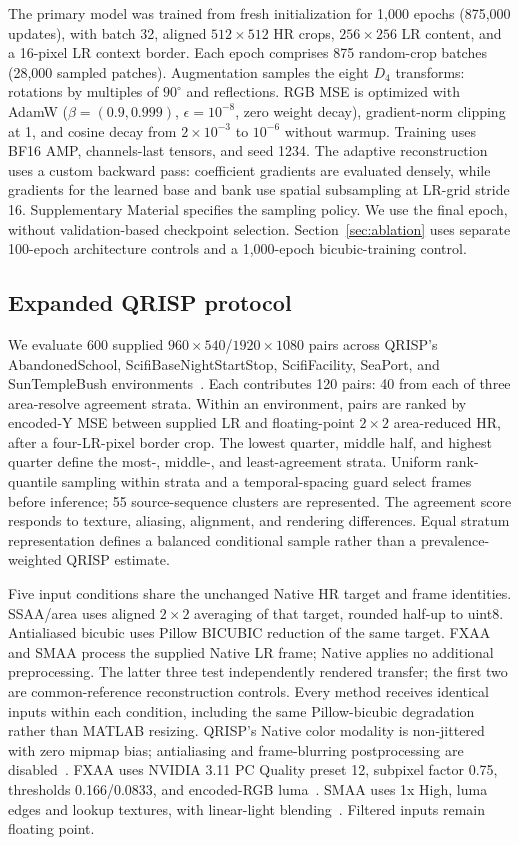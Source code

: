 \documentclass[10pt,twocolumn,letterpaper]{article}
\begin{document}
The primary model was trained from fresh initialization for 1,000 epochs (875,000 updates), with batch 32, aligned $512\times512$ HR crops, $256\times256$ LR content, and a 16-pixel LR context border.
Each epoch comprises 875 random-crop batches (28,000 sampled patches).
Augmentation samples the eight $D_4$ transforms: rotations by multiples of $90^\circ$ and reflections.
RGB MSE is optimized with AdamW ($\beta=(0.9,0.999)$, $\epsilon=10^{-8}$, zero weight decay), gradient-norm clipping at 1, and cosine decay from $2\times10^{-3}$ to $10^{-6}$ without warmup.
Training uses BF16 AMP, channels-last tensors, and seed 1234.
The adaptive reconstruction uses a custom backward pass: coefficient gradients are evaluated densely, while gradients for the learned base and bank use spatial subsampling at LR-grid stride 16.
Supplementary Material specifies the sampling policy.
We use the final epoch, without validation-based checkpoint selection.
Section~\ref{sec:ablation} uses separate 100-epoch architecture controls and a 1,000-epoch bicubic-training control.

\subsection{Expanded QRISP protocol}
\label{sec:luma-games}
We evaluate 600 supplied $960\times540$/$1920\times1080$ pairs across QRISP's AbandonedSchool, ScifiBaseNightStartStop, ScifiFacility, SeaPort, and SunTempleBush environments~\cite{mercier2023qrisp}.
Each contributes 120 pairs: 40 from each of three area-resolve agreement strata.
Within an environment, pairs are ranked by encoded-Y MSE between supplied LR and floating-point $2\times2$ area-reduced HR, after a four-LR-pixel border crop.
The lowest quarter, middle half, and highest quarter define the most-, middle-, and least-agreement strata.
Uniform rank-quantile sampling within strata and a temporal-spacing guard select frames before inference; 55 source-sequence clusters are represented.
The agreement score responds to texture, aliasing, alignment, and rendering differences.
Equal stratum representation defines a balanced conditional sample rather than a prevalence-weighted QRISP estimate.

Five input conditions share the unchanged Native HR target and frame identities.
SSAA/area uses aligned $2\times2$ averaging of that target, rounded half-up to uint8.
Antialiased bicubic uses Pillow BICUBIC reduction of the same target.
FXAA and SMAA process the supplied Native LR frame; Native applies no additional preprocessing.
The latter three test independently rendered transfer; the first two are common-reference reconstruction controls.
Every method receives identical inputs within each condition, including the same Pillow-bicubic degradation rather than MATLAB resizing.
QRISP's Native color modality is non-jittered with zero mipmap bias; antialiasing and frame-blurring postprocessing are disabled~\cite{mercier2023qrisp}.
FXAA uses NVIDIA 3.11 PC Quality preset 12, subpixel factor 0.75, thresholds 0.166/0.0833, and encoded-RGB luma~\cite{lottes2011fxaa311}.
SMAA uses 1x High, luma edges and lookup textures, with linear-light blending~\cite{jimenez2012smaa}.
Filtered inputs remain floating point.
\end{document}
